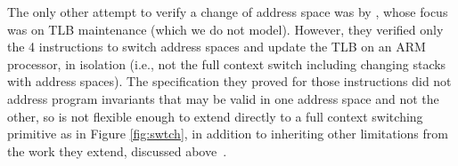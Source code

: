 



The only other attempt to verify a change of address space was by \citet{syeda2018program,syeda2020formal}, whose focus was on TLB maintenance (which we
do not model). However, they verified only the 4 instructions to switch address spaces and update the TLB on an ARM processor, in isolation
(i.e., not the full context switch including changing stacks with address spaces).
The specification they proved for those instructions did not address program invariants that may be valid in one address space and not the other,
so is not flexible enough to extend directly to a full context switching primitive as in Figure \ref{fig:swtch},
in addition to inheriting other limitations from the work they extend, discussed above~\cite{kolanski08vstte,kolanski09tphols}.

